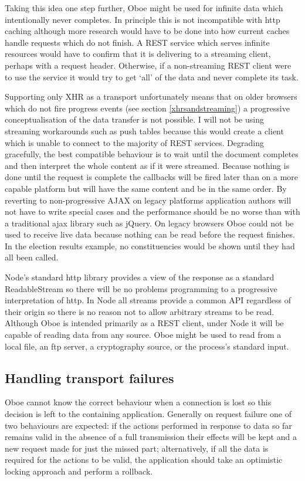 \documentclass[]{article}
\begin{document}
Taking this idea one step further, Oboe might be used for infinite data
which intentionally never completes. In principle this is not
incompatible with http caching although more research would have to be
done into how current caches handle requests which do not finish. A REST
service which serves infinite resources would have to confirm that it is
delivering to a streaming client, perhaps with a request header.
Otherwise, if a non-streaming REST client were to use the service it
would try to get `all' of the data and never complete its task.

Supporting only XHR as a transport unfortunately means that on older
browsers which do not fire progress events (see section
\ref{xhrsandstreaming}) a progressive conceptualisation of the data
transfer is not possible. I will not be using streaming workarounds such
as push tables because this would create a client which is unable to
connect to the majority of REST services. Degrading gracefully, the best
compatible behaviour is to wait until the document completes and then
interpret the whole content as if it were streamed. Because nothing is
done until the request is complete the callbacks will be fired later
than on a more capable platform but will have the same content and be in
the same order. By reverting to non-progressive AJAX on legacy platforms
application authors will not have to write special cases and the
performance should be no worse than with a traditional ajax library such
as jQuery. On legacy browsers Oboe could not be used to receive live
data because nothing can be read before the request finishes. In the
election results example, no constituencies would be shown until they
had all been called.

Node's standard http library provides a view of the response as a
standard ReadableStream so there will be no problems programming to a
progressive interpretation of http. In Node all streams provide a common
API regardless of their origin so there is no reason not to allow
arbitrary streams to be read. Although Oboe is intended primarily as a
REST client, under Node it will be capable of reading data from any
source. Oboe might be used to read from a local file, an ftp server, a
cryptography source, or the process's standard input.

\subsection{Handling transport failures}

Oboe cannot know the correct behaviour when a connection is lost so this
decision is left to the containing application. Generally on request
failure one of two behaviours are expected: if the actions performed in
response to data so far remains valid in the absence of a full
transmission their effects will be kept and a new request made for just
the missed part; alternatively, if all the data is required for the
actions to be valid, the application should take an optimistic locking
approach and perform a rollback.
\end{document}
